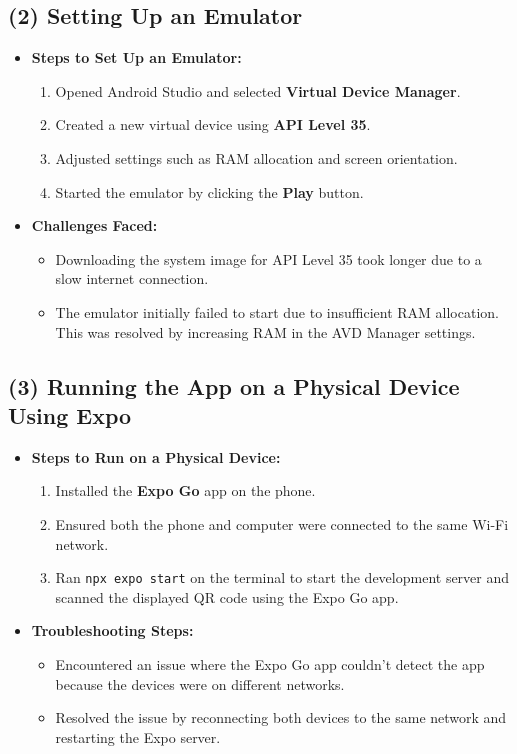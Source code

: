 \documentclass{article}
\begin{document}
\subsection*{(2) Setting Up an Emulator}
\begin{itemize}
    \item \textbf{Steps to Set Up an Emulator:}
    \begin{enumerate}
        \item Opened Android Studio and selected \textbf{Virtual Device Manager}.
        \item Created a new virtual device using \textbf{API Level 35}.
        \item Adjusted settings such as RAM allocation and screen orientation.
        \item Started the emulator by clicking the \textbf{Play} button.
    \end{enumerate}
    \item \textbf{Challenges Faced:}
    \begin{itemize}
        \item Downloading the system image for API Level 35 took longer due to a slow internet connection.
        \item The emulator initially failed to start due to insufficient RAM allocation. This was resolved by increasing RAM in the AVD Manager settings.
    \end{itemize}
\end{itemize}

\subsection*{(3) Running the App on a Physical Device Using Expo}
\begin{itemize}
    \item \textbf{Steps to Run on a Physical Device:}
    \begin{enumerate}
        \item Installed the \textbf{Expo Go} app on the phone.
        \item Ensured both the phone and computer were connected to the same Wi-Fi network.
        \item Ran \texttt{npx expo start} on the terminal to start the development server and scanned the displayed QR code using the Expo Go app.
    \end{enumerate}
    \item \textbf{Troubleshooting Steps:}
    \begin{itemize}
        \item Encountered an issue where the Expo Go app couldn’t detect the app because the devices were on different networks.
        \item Resolved the issue by reconnecting both devices to the same network and restarting the Expo server.
    \end{itemize}
\end{itemize}
\end{document}
